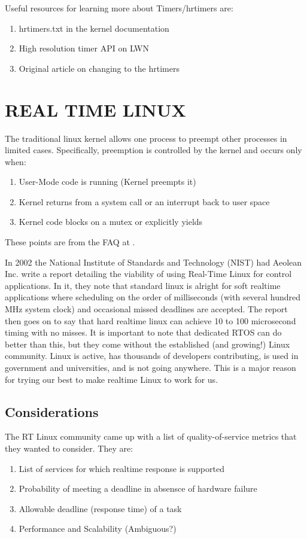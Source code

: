 \documentclass{article}
\begin{document}
Useful resources for learning more about Timers/hrtimers are:
\begin{enumerate}
\item hrtimers.txt in the kernel documentation \cite{highResTimerDoc}
\item High resolution timer API on LWN \cite{highResTimerAPI}
\item Original article on changing to the hrtimers \cite{newApproachToKernelTimers}
\end{enumerate}

\section{REAL TIME LINUX}
The traditional linux kernel allows one process to preempt other processes in limited cases.  Specifically, preemption is controlled by the kernel and occurs only when:

\begin{enumerate}
\item User-Mode code is running (Kernel preempts it)
\item Kernel returns from a system call or an interrupt back to user space
\item Kernel code blocks on a mutex or explicitly yields
\end{enumerate}
These points are from the FAQ at \cite{RealTimeLinux}.

In 2002 the National Institute of Standards and Technology (NIST) had Aeolean Inc. write a report detailing the viability of using Real-Time Linux for control applications. \cite{IntroLinuxForRealTime}  In it, they note that standard linux is alright for soft realtime applications where scheduling on the order of milliseconds (with several hundred MHz system clock) and occasional missed deadlines are accepted.  The report then goes on to say that hard realtime linux can achieve 10 to 100 microsecond timing with no misses.  It is important to note that dedicated RTOS can do better than this, but they come without the established (and growing!) Linux community.  Linux is active, has thousands of developers contributing, is used in government and universities, and is not going anywhere.  This is a major reason for trying our best to make realtime Linux to work for us.

\subsection{Considerations}
The RT Linux community came up with a list of quality-of-service metrics that they wanted to consider. \cite{RTLSummaryPost}  They are:
\begin{enumerate}
\item List of services for which realtime response is supported
\item Probability of meeting a deadline in absensce of hardware failure
\item Allowable deadline (response time) of a task
\item Performance and Scalability (Ambiguous?)
\end{enumerate}
\end{document}
